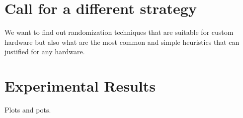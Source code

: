 \documentclass[manuscript,screen]{acmart}
\begin{document}
\section{Call for a different strategy}
\label{sec:strategy}
We want to find out randomization techniques that are suitable for
custom hardware but also what are the most common and simple
heuristics that can justified for any hardware.


\section{Experimental Results}
\label{sec:experimentalresults}
Plots and pots.




%

 

%
\end{document}
